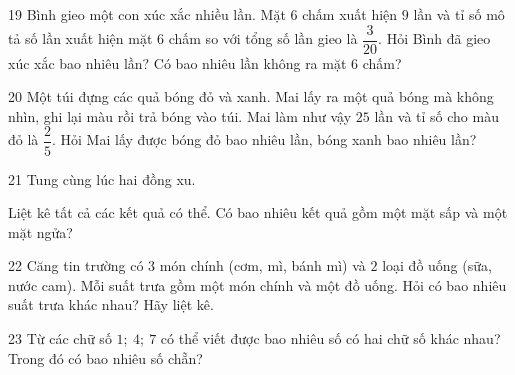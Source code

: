 \gap
\begin{probbox}{19}{\relax}
Bình gieo một con xúc xắc nhiều lần. Mặt $6$ chấm xuất hiện $9$ lần và tỉ số mô tả số lần xuất hiện mặt $6$ chấm so với tổng số lần gieo là $\dfrac{3}{20}$. Hỏi Bình đã gieo xúc xắc bao nhiêu lần? Có bao nhiêu lần không ra mặt $6$ chấm?
\end{probbox}
\gap
\begin{probbox}{20}{\relax}
Một túi đựng các quả bóng đỏ và xanh. Mai lấy ra một quả bóng mà không nhìn, ghi lại màu rồi trả bóng vào túi. Mai làm như vậy $25$ lần và tỉ số cho màu đỏ là $\dfrac25$. Hỏi Mai lấy được bóng đỏ bao nhiêu lần, bóng xanh bao nhiêu lần?
\end{probbox}
\gap
\begin{probbox}{21}{\relax}
Tung cùng lúc hai đồng xu.\par
{} Liệt kê tất cả các kết quả có thể. \quad {} Có bao nhiêu kết quả gồm một mặt sấp và một mặt ngửa?
\end{probbox}
\gap
\begin{probbox}{22}{\relax}
Căng tin trường có $3$ món chính (cơm, mì, bánh mì) và $2$ loại đồ uống (sữa, nước cam). Mỗi suất trưa gồm một món chính và một đồ uống. Hỏi có bao nhiêu suất trưa khác nhau? Hãy liệt kê.
\end{probbox}
\gap
\begin{probbox}{23}{\relax}
Từ các chữ số $1;\ 4;\ 7$ có thể viết được bao nhiêu số có hai chữ số khác nhau? Trong đó có bao nhiêu số chẵn?
\end{probbox}
